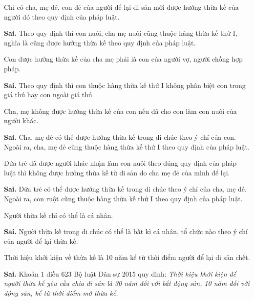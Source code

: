 \begin{ques}
Chỉ có cha, mẹ đẻ, con đẻ của người để lại di sản mới được hưởng thừa kế của người đó theo quy định của pháp luật.
\end{ques}
\begin{ans}
\textbf{Sai.} Theo quy định thì con nuôi, cha mẹ nuôi cũng thuộc hàng thừa kế thứ I, nghĩa là cũng được hưởng thừa kế theo quy định của pháp luật.
\end{ans}

\begin{ques}
Con được hưởng thừa kế của cha mẹ phải là con của người vợ, người chồng hợp pháp.
\end{ques}
\begin{ans}
\textbf{Sai.} Theo quy định thì con thuộc hàng thừa kế thứ I không phân biệt con trong giá thú hay con ngoài giá thú.
\end{ans}

\begin{ques}
Cha, mẹ không được hưởng thừa kế của con nếu đã cho con làm con nuôi của người khác.
\end{ques}
\begin{ans}
\textbf{Sai.} Cha, mẹ đẻ có thể được hưởng thừa kế trong di chúc theo ý chí của con. Ngoài ra, cha, mẹ đẻ cũng thuộc hàng thừa kế thứ I theo quy định của pháp luật.
\end{ans}

\begin{ques}
Đứa trẻ đã được người khác nhận làm con nuôi theo đúng quy định của pháp luật thì không được hưởng thừa kế từ di sản do cha mẹ đẻ của mình để lại.
\end{ques}
\begin{ans}
\textbf{Sai.} Đứa trẻ có thể được hưởng thừa kế trong di chúc theo ý chí của cha, mẹ đẻ. Ngoài ra, con ruột cũng thuộc hàng thừa kế thứ I theo quy định của pháp luật.
\end{ans}

\begin{ques}
Người thừa kế chỉ có thể là cá nhân.
\end{ques}
\begin{ans}
\textbf{Sai.} Người thừa kế trong di chúc có thể là bất kì cá nhân, tổ chức nào theo ý chí của người để lại thừa kế.
\end{ans}

\begin{ques}
Thời hiệu khởi kiện về thừa kế là 10 năm kể từ thời điểm người để lại di sản chết.
\end{ques}
\begin{ans}
\textbf{Sai.} Khoản 1 điều 623 Bộ luật Dân sự 2015 quy đinh: \textit{Thời hiệu khởi kiện để người thừa kế yêu cầu chia di sản là 30 năm đối với bất động sản, 10 năm đối với động sản, kể từ thời điểm mở thừa kế.}
\end{ans}


